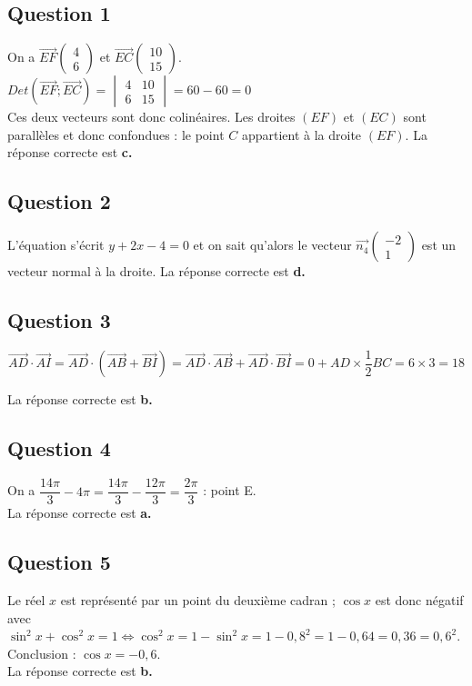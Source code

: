 \subsection*{Question 1}
	

On a $\overrightarrow{EF} \left( \begin{array}{c} 4 \\ 6 \end{array} \right)$ et $\overrightarrow{EC} \left( \begin{array}{c} 10 \\ 15 \end{array} \right)$.\\
$Det\left(\overrightarrow{EF};\overrightarrow{EC}\right) =\begin{vmatrix} 4&10\\6&15\end{vmatrix}=60-60=0$\\
Ces deux vecteurs sont donc colinéaires. Les droites $(EF)$ et $(EC)$ sont parallèles et donc confondues : le point $C$ appartient à la droite $(EF)$. La réponse correcte est \textbf{c.}
	
	\subsection*{Question 2}
	
L'équation s'écrit $y + 2x - 4 = 0$ et on sait qu'alors le vecteur $\overrightarrow{n_4} \left( \begin{array}{c} -2 \\ 1 \end{array} \right)$ est un vecteur normal à la droite. La réponse correcte est \textbf{d.}
	
	\subsection*{Question 3}
	
\[
	\overrightarrow{AD} \cdot \overrightarrow{AI} = \overrightarrow{AD} \cdot (\overrightarrow{AB} + \overrightarrow{BI}) = \overrightarrow{AD} \cdot \overrightarrow{AB} + \overrightarrow{AD} \cdot \overrightarrow{BI} = 0 + AD \times \dfrac{1}{2} BC = 6 \times 3 = 18
	\]
	
La réponse correcte est \textbf{b.}
	
	\subsection*{Question 4}
	
On a $\dfrac{14\pi}{3} - 4\pi = \dfrac{14\pi}{3} - \dfrac{12\pi}{3} = \dfrac{2\pi}{3}$ : point E.\\
La réponse correcte est \textbf{a.}
	
	\subsection*{Question 5}
	
Le réel $x$ est représenté par un point du deuxième cadran ; $\cos x$ est donc négatif avec $\sin^2 x + \cos^2 x = 1 \Leftrightarrow \cos^2 x = 1 - \sin^2 x = 1 - 0,8^2 = 1 - 0,64 = 0,36 = 0,6^2$. Conclusion : $\cos x = -0,6$.\\
La réponse correcte est \textbf{b.}
